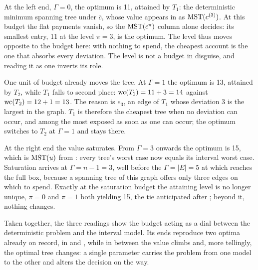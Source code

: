 At the left end, $\Gamma = 0$, the optimum is 11, attained by $T_1$: the deterministic minimum spanning tree under $\bar{c}$, whose value appears in  as $\mathrm{MST}(c^{(3)})$.
At this budget the flat payments vanish, so the $\mathrm{MST}(c^{\pi})$ column alone decides: its smallest entry, 11 at the level $\pi = 3$, is the optimum.
The level thus moves opposite to the budget here: with nothing to spend, the cheapest account is the one that absorbs every deviation.
The level is not a budget in disguise, and reading it as one inverts its role.

One unit of budget already moves the tree.
At $\Gamma = 1$ the optimum is 13, attained by $T_2$, while $T_1$ falls to second place: $\mathrm{wc}(T_1) = 11 + 3 = 14$ against $\mathrm{wc}(T_2) = 12 + 1 = 13$.
The reason is $e_3$, an edge of $T_1$ whose deviation 3 is the largest in the graph.
$T_1$ is therefore the cheapest tree when no deviation can occur, and among the most exposed as soon as one can occur; the optimum switches to $T_2$ at $\Gamma = 1$ and stays there.

At the right end the value saturates.
From $\Gamma = 3$ onwards the optimum is 15, which is $\mathrm{MST}(u)$ from : every tree's worst case now equals its interval worst case.
Saturation arrives at $\Gamma = n-1 = 3$, well before the $\Gamma = |E| = 5$ at which  reaches the full box, because a spanning tree of this graph offers only three edges on which to spend.
Exactly at the saturation budget the attaining level is no longer unique, $\pi = 0$ and $\pi = 1$ both yielding 15, the tie anticipated after ; beyond it, nothing changes.

Taken together, the three readings show the budget acting as a dial between the deterministic problem and the interval model.
Its ends reproduce two optima already on record, in  and , while in between the value climbs and, more tellingly, the optimal tree changes: a single parameter carries the problem from one model to the other and alters the decision on the way.



